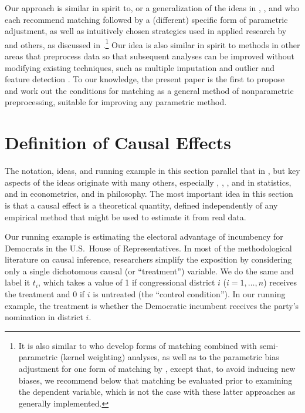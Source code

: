 \documentclass[11pt,titlepage]{article}
\begin{document}
Our approach is similar in spirit to, or a generalization of the ideas
in \citet{RosRub84a}, \citet{Rubin79}, and \citet{RubTho00} who each
recommend matching followed by a (different) specific form of
parametric adjustment, as well as intuitively chosen strategies used
in applied research by \citet{Rosenbaum86} and others, as discussed in
\citet{GlaLevMye03}.\footnote{It is also similar to
  \citet{HecIchTod98} who develop forms of matching combined with
  semi-parametric (kernel weighting) analyses, as well as to the
  parametric bias adjustment for one form of matching by
  \citet{AbaImb04}, except that, to avoid inducing new biases, we
  recommend below that matching be evaluated prior to examining the
  dependent variable, which is not the case with these latter
  approaches as generally implemented.}  Our idea is also similar in
spirit to methods in other areas that preprocess data so that
subsequent analyses can be improved without modifying existing
techniques, such as multiple imputation \citep{Rubin87,KinHonJos01}
and outlier and feature detection \citep[][Ch.8]{Bishop95}.  To our
knowledge, the present paper is the first to propose and work out the
conditions for matching as a general method of nonparametric
preprocessing, suitable for improving any parametric method.

\section{Definition of Causal Effects}

The notation, ideas, and running example in this section parallel that
in \citet[][Section 3.1.1]{KinKeoVer94}, but key aspects of the ideas
originate with many others, especially \citet{Neyman23b},
\citet{Fisher35}, \citet{Cox58}, \citet{Rubin74} and \citet{Holland86}
in statistics, \citet{Roy51} and \citet{Quandt72} in econometrics, and
\citet{Lewis73} in philosophy.  The most important idea in this
section is that a causal effect is a theoretical quantity, defined
independently of any empirical method that might be used to estimate
it from real data.

Our running example is estimating the electoral advantage of
incumbency for Democrats in the U.S.\ House of Representatives.  In
most of the methodological literature on causal inference, researchers
simplify the exposition by considering only a single dichotomous
causal (or ``treatment'') variable.  We do the same and label it
$t_i$, which takes a value of 1 if congressional district $i$
($i=1,\dots,n$) receives the treatment and 0 if $i$ is untreated (the
``control condition'').  In our running example, the treatment is
whether the Democratic incumbent receives the party's nomination in
district $i$.
\end{document}
